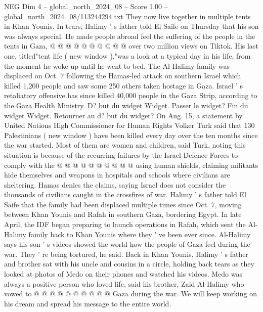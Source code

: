 \begin{textsample}{NEG Dim 4 – global\_north\_2024\_08 – Score 1.00 – global\_north\_2024\_08/113244294.txt}
They now live together in multiple tents in Khan Younis.
In tears, Halimy ' s father told El Saife on Thursday that his son was always special.
He made people abroad feel the suffering of the people in the tents in Gaza, @ @ @ @ @ @ @ @ @ @ over two million views on Tiktok.
His last one, titled"tent life ( new window ),"was a look at a typical day in his life, from the moment he woke up until he went to bed.
The Al-Halimy family was displaced on Oct. 7 following the Hamas-led attack on southern Israel which killed 1,200 people and saw some 250 others taken hostage in Gaza.
Israel ' s retaliatory offensive has since killed 40,000 people in the Gaza Strip, according to the Gaza Health Ministry.
D? but du widget Widget.
Passer le widget?
Fin du widget Widget.
Retourner au d? but du widget?
On Aug. 15, a statement by United Nations High Commissioner for Human Rights Volker Turk said that 130 Palestinians ( new window ) have been killed every day over the ten months since the war started.
Most of them are women and children, said Turk, noting this situation is because of the recurring failures by the Israel Defence Forces to comply with the @ @ @ @ @ @ @ @ @ @ using human shields, claiming militants hide themselves and weapons in hospitals and schools where civilians are sheltering.
Hamas denies the claims, saying Israel does not consider the thousands of civilians caught in the crossfires of war.
Halimy ' s father told El Saife that the family had been displaced multiple times since Oct. 7, moving between Khan Younis and Rafah in southern Gaza, bordering Egypt.
In late April, the IDF began preparing to launch operations in Rafah, which sent the Al-Halimy family back to Khan Younis where they ' ve been ever since.
Al-Halimy says his son ' s videos showed the world how the people of Gaza feel during the war.
They ' re being tortured, he said.
Back in Khan Younis, Halimy ' s father and brother sat with his uncle and cousins in a circle, holding back tears as they looked at photos of Medo on their phones and watched his videos.
Medo was always a positive person who loved life, said his brother, Zaid Al-Halimy who vowed to @ @ @ @ @ @ @ @ @ @ Gaza during the war.
We will keep working on his dream and spread his message to the entire world.

\end{textsample}
